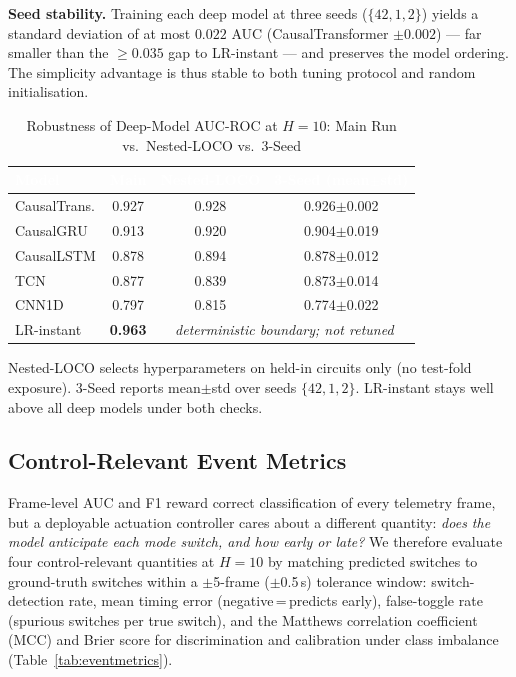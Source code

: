 \documentclass[conference,a4paper]{IEEEtran}
\begin{document}
\textbf{Seed stability.}
Training each deep model at three seeds ($\{42,1,2\}$) yields a standard deviation of at
most $0.022$ AUC (CausalTransformer $\pm0.002$) — far smaller than the $\geq0.035$ gap to
LR-instant — and preserves the model ordering. The simplicity advantage is thus stable to
both tuning protocol and random initialisation.

\begin{table}[h]
\caption{Robustness of Deep-Model AUC-ROC at $H{=}10$: Main Run vs.\ Nested-LOCO vs.\ 3-Seed}
\label{tab:robust}
\centering
\small
\renewcommand{\arraystretch}{1.25}
\begin{tabular}{lccc}
\toprule
\rowcolor{hdrgreen}
\textcolor{white}{\textbf{Model}} &
\textcolor{white}{\textbf{Main}} &
\textcolor{white}{\textbf{Nested-LOCO}} &
\textcolor{white}{\textbf{3-Seed (mean$\pm$std)}} \\
\midrule
CausalTrans.   & 0.927 & 0.928 & 0.926$\pm$0.002 \\
CausalGRU      & 0.913 & 0.920 & 0.904$\pm$0.019 \\
CausalLSTM     & 0.878 & 0.894 & 0.878$\pm$0.012 \\
TCN            & 0.877 & 0.839 & 0.873$\pm$0.014 \\
CNN1D          & 0.797 & 0.815 & 0.774$\pm$0.022 \\
\midrule
LR-instant     & \textbf{0.963} & \multicolumn{2}{c}{\textit{deterministic boundary; not retuned}} \\
\bottomrule
\end{tabular}
\begin{flushleft}
\footnotesize
Nested-LOCO selects hyperparameters on held-in circuits only (no test-fold exposure).
3-Seed reports mean$\pm$std over seeds $\{42,1,2\}$. LR-instant stays well above all deep
models under both checks.
\end{flushleft}
\end{table}

\subsection{Control-Relevant Event Metrics}

Frame-level AUC and F1 reward correct classification of every telemetry frame, but a
deployable actuation controller cares about a different quantity: \emph{does the model
anticipate each mode switch, and how early or late?}
We therefore evaluate four control-relevant quantities at $H{=}10$ by matching predicted
switches to ground-truth switches within a $\pm$5-frame ($\pm$0.5\,s) tolerance window:
switch-detection rate, mean timing error (negative\,=\,predicts early), false-toggle
rate (spurious switches per true switch), and the Matthews correlation coefficient (MCC)
and Brier score for discrimination and calibration under class imbalance
(Table~\ref{tab:eventmetrics}).
\end{document}
